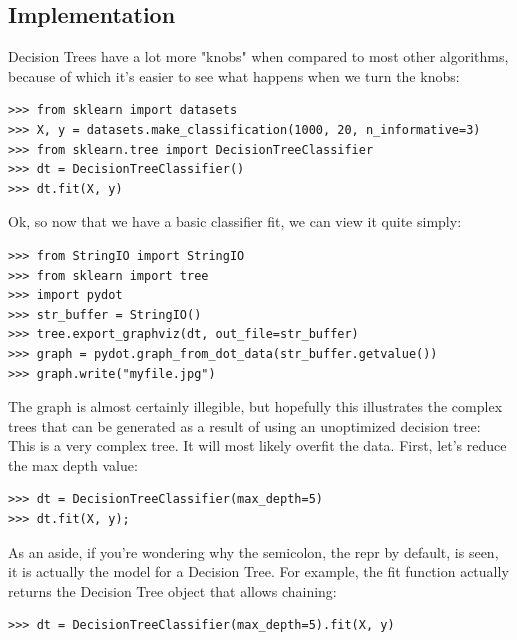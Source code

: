 \documentclass[SKL-MASTER.tex]{subfiles}
\begin{document}
\subsection*{Implementation}
Decision Trees have a lot more "knobs" when compared to most other algorithms, because of
which it's easier to see what happens when we turn the knobs:
\begin{framed}
\begin{verbatim}
>>> from sklearn import datasets
>>> X, y = datasets.make_classification(1000, 20, n_informative=3)
>>> from sklearn.tree import DecisionTreeClassifier
>>> dt = DecisionTreeClassifier()
>>> dt.fit(X, y)
\end{verbatim}
\end{framed}
Ok, so now that we have a basic classifier fit, we can view it quite simply:
\begin{framed}
\begin{verbatim}
>>> from StringIO import StringIO
>>> from sklearn import tree
>>> import pydot
>>> str_buffer = StringIO()
>>> tree.export_graphviz(dt, out_file=str_buffer)
>>> graph = pydot.graph_from_dot_data(str_buffer.getvalue())
>>> graph.write("myfile.jpg")
\end{verbatim}
\end{framed}
The graph is almost certainly illegible, but hopefully this illustrates the complex trees that can
be generated as a result of using an unoptimized decision tree:
This is a very complex tree. It will most likely overfit the data. First, let's reduce the max
depth value:
\begin{framed}
\begin{verbatim}
>>> dt = DecisionTreeClassifier(max_depth=5)
>>> dt.fit(X, y);
\end{verbatim}
\end{framed}
As an aside, if you're wondering why the semicolon, the repr by default, is seen, it is actually
the model for a Decision Tree. For example, the fit function actually returns the Decision
Tree object that allows chaining:
\begin{framed}
\begin{verbatim}
>>> dt = DecisionTreeClassifier(max_depth=5).fit(X, y)
\end{verbatim}
\end{framed}
\end{document}
